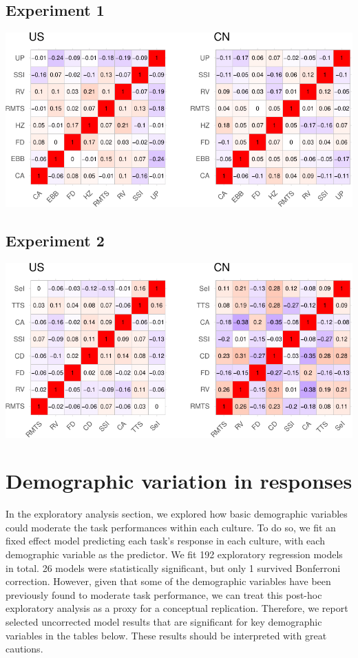 \documentclass[
  man,floatsintext]{apa6}
\begin{document}
\hypertarget{experiment-1-1}{%
\subsection{Experiment 1}\label{experiment-1-1}}

\includegraphics{CCRR_manuscript_files/figure-latex/unnamed-chunk-52-1.pdf}

\hypertarget{experiment-2-1}{%
\subsection{Experiment 2}\label{experiment-2-1}}

\includegraphics{CCRR_manuscript_files/figure-latex/unnamed-chunk-53-1.pdf}

\hypertarget{demographic-variation-in-responses}{%
\section{Demographic variation in responses}\label{demographic-variation-in-responses}}

In the exploratory analysis section, we explored how basic demographic variables could moderate the task performances within each culture. To do so, we fit an fixed effect model predicting each task's response in each culture, with each demographic variable as the predictor. We fit 192 exploratory regression models in total. 26 models were statistically significant, but only 1 survived Bonferroni correction. However, given that some of the demographic variables have been previously found to moderate task performance, we can treat this post-hoc exploratory analysis as a proxy for a conceptual replication. Therefore, we report selected uncorrected model results that are significant for key demographic variables in the tables below. These results should be interpreted with great cautions.
\end{document}

